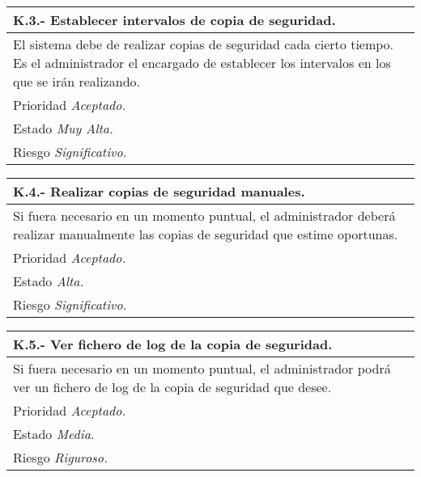 	\begin{center}
	\begin{tabulary}{15cm}{|L|}
		\hline
			\bf{K.3.- Establecer intervalos de copia de seguridad.} \\
		\hline
			El sistema debe de realizar copias de seguridad cada cierto tiempo. Es el administrador el encargado de establecer los intervalos en los que se irán realizando. \\
		\hline
			Prioridad \textit{Aceptado.} \\
		\hline
			Estado \textit{Muy Alta.} \\
		\hline
			Riesgo \textit{Significativo.} \\
		\hline
	\end{tabulary}
	\end{center}

	\begin{center}
	\begin{tabulary}{15cm}{|L|}
		\hline
			\bf{K.4.- Realizar copias de seguridad manuales.} \\
		\hline
			Si fuera necesario en un momento puntual, el administrador deberá realizar manualmente las copias de seguridad que estime oportunas. \\
		\hline
			Prioridad \textit{Aceptado.} \\
		\hline
			Estado \textit{Alta.} \\
		\hline
			Riesgo \textit{Significativo.} \\
		\hline
	\end{tabulary}
	\end{center}

	\begin{center}
	\begin{tabulary}{15cm}{|L|}
		\hline
			\bf{K.5.- Ver fichero de log de la copia de seguridad.} \\
		\hline
			Si fuera necesario en un momento puntual, el administrador podrá ver un fichero de log de la copia de seguridad que desee. \\
		\hline
			Prioridad \textit{Aceptado.} \\
		\hline
			Estado \textit{Media.} \\
		\hline
			Riesgo \textit{Riguroso.} \\
		\hline
	\end{tabulary}
	\end{center}

